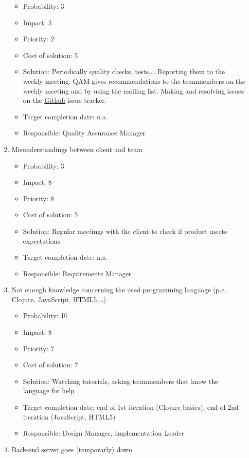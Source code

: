 \documentclass[9pt]{article}
\begin{document}
\begin{enumerate}
  \begin{itemize}
  \itemsep1pt\parskip0pt
  \item
    Probability: 3
  \item
    Impact: 3
  \item
    Priority: 2
  \item
    Cost of solution: 5
  \item
    Solution: Periodically quality checks, tests,\ldots{} Reporting them
    to the weekly meeting. QAM gives recommendations to the teammembers
    on the weekly meeting and by using the mailing list. Making and
    resolving issues on the \hyperref[Github]{Github} issue tracker.
  \item
    Target completion date: n.a.
  \item
    Responsible: Quality Assurance Manager
  \end{itemize}
\item
  Misunderstandings between client and team

  \begin{itemize}
  \itemsep1pt\parskip0pt
  \item
    Probability: 3
  \item
    Impact: 8
  \item
    Priority: 8
  \item
    Cost of solution: 5
  \item
    Solution: Regular meetings with the client to check if product meets
    expectations
  \item
    Target completion date: n.a.
  \item
    Responsible: Requirements Manager
  \end{itemize}
\item
  Not enough knowledge concerning the used programming language (p.e.
  Clojure, JavaScript, HTML5,\ldots{})

  \begin{itemize}
  \itemsep1pt\parskip0pt
  \item
    Probability: 10
  \item
    Impact: 8
  \item
    Priority: 7
  \item
    Cost of solution: 7
  \item
    Solution: Watching tutorials, asking teammembers that know the
    language for help
  \item
    Target completion date: end of 1st iteration (Clojure basics), end
    of 2nd iteration (JavaScript, HTML5)
  \item
    Responsible: Design Manager, Implementation Leader
  \end{itemize}
\item
  Back-end server goes (temporarly) down


\end{enumerate}
\end{document}
